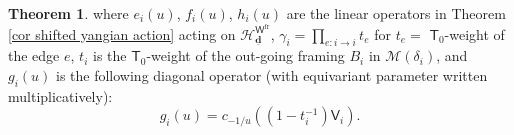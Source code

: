 \documentclass[10pt]{amsart}
\theoremstyle{definition}
\newtheorem{Theorem}{Theorem}[section]
\numberwithin{equation}{section}
\newcommand{\bd}{\mathbf{d}}
\newcommand{\cH}{\mathcal{H}}
\newcommand{\cM}{\mathcal{M}}
\newcommand{\sT}{\mathsf{T}}
\newcommand{\sW}{\mathsf{W}}
\begin{document}
\begin{Theorem}
where $e_i(u)$, $f_i(u)$, $h_i(u)$ are the linear operators in Theorem \ref{cor shifted yangian action} acting on $\cH^{\sW^{\mathrm{fr}}}_{\underline{\bd}}$, $\gamma_i=\prod_{e:i\to i}t_e$ for $t_e=$ $\sT_0$-weight of the edge $e$,  $t_i$ is the $\sT_0$-weight of the out-going framing $B_i$ in $\cM(\delta_i)$, and $g_i(u)$ is the following diagonal operator (with equivariant parameter written multiplicatively):
\begin{equation}
\label{equ on gi}
    g_i(u)=c_{-1/u}((1-t_i^{-1})\mathsf V_i).
\end{equation}
\end{Theorem}
\end{document}

